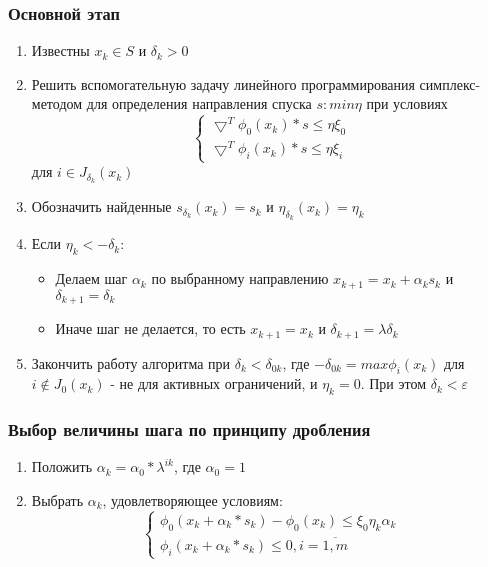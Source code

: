 \documentclass[../body.tex]{subfiles}
\begin{document}
\subsubsection{Основной этап}
\begin{enumerate}
    \item Известны $x_k\in S$ и $\delta_k>0$
    \item Решить вспомогательную задачу линейного программирования симплекс-методом для определения направления спуска $s:min\eta$ при условиях
        \begin{equation}
            \left\{
            \begin{array}{ll}
                \bigtriangledown^T\phi_0(x_k)*s\leq\eta\xi_0\\
                \bigtriangledown^T\phi_i(x_k)*s\leq\eta\xi_i
            \end{array}
            \right.
        \end{equation}
        для $i\in J_{\delta_k}(x_k)$
    \item Обозначить найденные $s_{\delta_k}(x_k)=s_k$ и $\eta_{\delta_k}(x_k)=\eta_k$
    \item Если $\eta_k<-\delta_k:$
        \begin{itemize}
            \item Делаем шаг $\alpha_k$ по выбранному направлению $x_{k+1}=x_k+\alpha_ks_k$ и $\delta_{k+1}=\delta_k$
            \item Иначе шаг не делается, то есть $x_{k+1}=x_k$ и $\delta_{k+1}=\lambda\delta_k$
        \end{itemize}
    \item Закончить работу алгоритма при $\delta_k<\delta_{0k}$, где $-\delta_{0k}=max\phi_i(x_k)$ для $i\not\in J_0(x_k)$ - не для активных ограничений, и $\eta_k=0$. При этом $\delta_k<\varepsilon$
\end{enumerate}

\subsubsection{Выбор величины шага по принципу дробления}
\begin{enumerate}
    \item Положить $\alpha_k=\alpha_0*\lambda^{ik}$, где $\alpha_0=1$
    \item Выбрать $\alpha_k$, удовлетворяющее условиям:
        \begin{equation}
            \left\{
            \begin{array}{ll}
                \phi_0(x_k+\alpha_k*s_k)-\phi_0(x_k)\leq\xi_0\eta_k\alpha_k\\
                \phi_i(x_k+\alpha_k*s_k)\leq0,i=\overline{1,m}
            \end{array}
            \right.
        \end{equation}
\end{enumerate}
\end{document}
